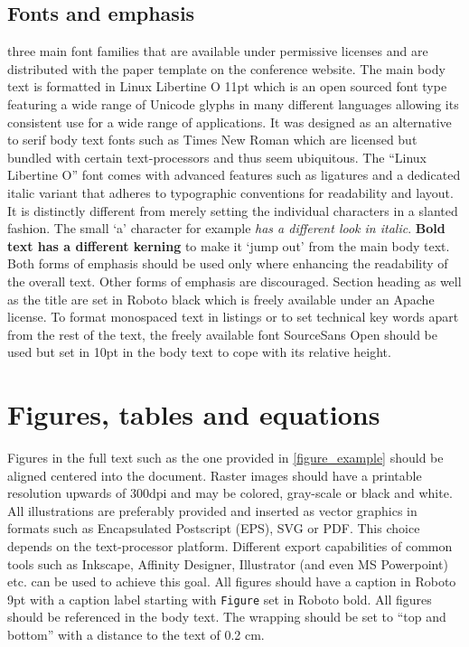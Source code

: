 \subsection{Fonts and emphasis}
three main font families that are available under permissive licenses and are distributed with the paper template on the conference website.
The main body text is formatted in Linux Libertine O 11pt which is an open sourced font type featuring a wide range of Unicode glyphs in many different languages allowing its consistent use for a wide range of applications. It was designed as an alternative to serif body text fonts such as Times New Roman which are licensed but bundled with certain text-processors and thus seem ubiquitous.
The “Linux Libertine O” font comes with advanced features such as ligatures and a dedicated italic variant that adheres to typographic conventions for readability and layout. It is distinctly different from merely setting the individual characters in a slanted fashion. The small ‘a’ character for example \textit{has a different look in italic}. \textbf{Bold text has a different kerning} to make it ‘jump out’ from the main body text. Both forms of emphasis should be used only where enhancing the readability of the overall text. Other forms of emphasis are discouraged.
Section heading as well as the title are set in Roboto black which is freely available under an Apache license. To format monospaced text in listings or to set technical key words apart from the rest of the text, the freely available font SourceSans Open should be used but set in 10pt in the body text to cope with its relative height.


\section{Figures, tables and equations}
Figures in the full text such as the one provided in \ref{figure_example} should be aligned centered into the document. Raster images should have a printable resolution upwards of 300dpi and may be colored, gray-scale or black and white. All illustrations are preferably provided and inserted as vector graphics in formats such as Encapsulated Postscript (EPS), SVG or PDF. This choice depends on the text-processor platform. Different export capabilities of common tools such as Inkscape, Affinity Designer, Illustrator (and even MS Powerpoint) etc. can be used to achieve this goal. All figures should have a caption in Roboto 9pt with a caption label starting with \texttt{Figure} set in Roboto bold. All figures should be referenced in the body text. The wrapping should be set to “top and bottom” with a distance to the text of 0.2 cm. 

